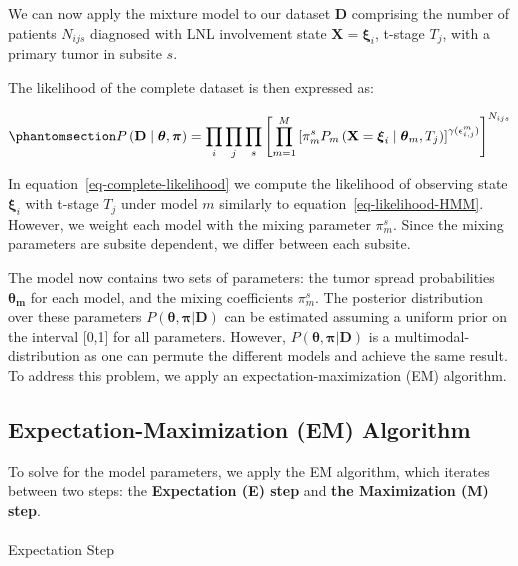 \documentclass[
  sn-mathphys-num,
]{sn-jnl}
\makeatletter
\let\oldparagraph\paragraph
\renewcommand{\paragraph}{
    \@ifstar
      \xxxParagraphStar
      \xxxParagraphNoStar
  }
\newcommand{\xxxParagraphStar}[1]{\oldparagraph*{#1}\mbox{}}
\newcommand{\xxxParagraphNoStar}[1]{\oldparagraph{#1}\mbox{}}
\makeatother
\begin{document}
We can now apply the mixture model to our dataset \(\mathbf{D}\)
comprising the number of patients \(N_{ijs}\) diagnosed with LNL
involvement state \(\mathbf{X} = \boldsymbol{\xi}_i\), t-stage \(T_j\),
with a primary tumor in subsite \(s\).

The likelihood of the complete dataset is then expressed as:

\begin{equation}\phantomsection\label{eq-complete-likelihood-explicite}{
P \left( \mathbf{D} \mid \boldsymbol{\theta}, \boldsymbol{\pi}\right) = \prod_i \prod_j \prod_s \left[ \prod_{m=1}^M \left[ \pi_m^s P_m \left( \mathbf{X}=\boldsymbol{\xi}_i \mid \boldsymbol{\theta}_m, T_j \right) \right]^{\gamma(\epsilon_{i,j}^m)} \right]^{N_{ijs}}
}\end{equation}

In equation~\ref{eq-complete-likelihood} we compute the likelihood of
observing state \(\boldsymbol{\xi}_i\) with t-stage \(T_j\) under model
\(m\) similarly to equation~\ref{eq-likelihood-HMM}. However, we weight
each model with the mixing parameter \(\pi_m^s\). Since the mixing
parameters are subsite dependent, we differ between each subsite.

The model now contains two sets of parameters: the tumor spread
probabilities \(\mathbf{\theta_m}\) for each model, and the mixing
coefficients \(\pi_m^s\). The posterior distribution over these
parameters \(P(\boldsymbol{\theta},\boldsymbol{\pi}|\mathbf{D})\) can be
estimated assuming a uniform prior on the interval {[}0,1{]} for all
parameters. However,
\(P(\boldsymbol{\theta},\boldsymbol{\pi}|\mathbf{D})\) is a
multimodal-distribution as one can permute the different models and
achieve the same result. To address this problem, we apply an
expectation-maximization (EM) algorithm.

\subsection{Expectation-Maximization (EM)
Algorithm}\label{expectation-maximization-em-algorithm}

To solve for the model parameters, we apply the EM algorithm, which
iterates between two steps: the \textbf{Expectation (E) step} and
\textbf{the Maximization (M) step}.

\paragraph{Expectation Step}\label{expectation-step}
\end{document}
